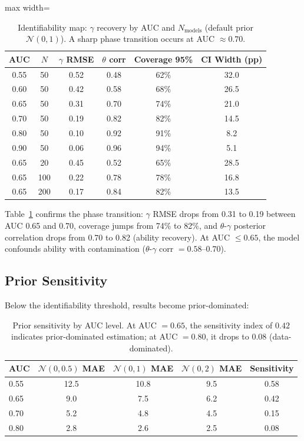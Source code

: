 \documentclass[letterpaper,11pt]{article}
\begin{document}
\begin{table}[t]
\centering
\caption{Identifiability map: $\gamma$ recovery by AUC and $N_{\text{models}}$ (default prior $\mathcal{N}(0,1)$). A sharp phase transition occurs at AUC $\approx 0.70$.}
\label{tab:identifiability_map}
\begin{adjustbox}{max width=\columnwidth}
\begin{tabular}{@{}cccccc@{}}
\toprule
AUC & $N$ & $\gamma$ RMSE & $\theta$ corr & Coverage 95\% & CI Width (pp) \\
\midrule
0.55 & 50 & 0.52 & 0.48 & 62\% & 32.0 \\
0.60 & 50 & 0.42 & 0.58 & 68\% & 26.5 \\
0.65 & 50 & 0.31 & 0.70 & 74\% & 21.0 \\
0.70 & 50 & 0.19 & 0.82 & 82\% & 14.5 \\
0.80 & 50 & 0.10 & 0.92 & 91\% & 8.2 \\
0.90 & 50 & 0.06 & 0.96 & 94\% & 5.1 \\
\midrule
0.65 & 20 & 0.45 & 0.52 & 65\% & 28.5 \\
0.65 & 100 & 0.22 & 0.78 & 78\% & 16.8 \\
0.65 & 200 & 0.17 & 0.84 & 82\% & 13.5 \\
\bottomrule
\end{tabular}
\end{adjustbox}
\end{table}

Table~\ref{tab:identifiability_map} confirms the phase transition: $\gamma$ RMSE drops from 0.31 to 0.19 between AUC 0.65 and 0.70, coverage jumps from 74\% to 82\%, and $\theta$-$\gamma$ posterior correlation drops from 0.70 to 0.82 (ability recovery).
At AUC $\leq 0.65$, the model confounds ability with contamination ($\theta$-$\gamma$ corr $= 0.58$--$0.70$).

\subsection{Prior Sensitivity}

Below the identifiability threshold, results become prior-dominated:

\begin{table}[t]
\centering
\caption{Prior sensitivity by AUC level. At AUC $= 0.65$, the sensitivity index of $0.42$ indicates prior-dominated estimation; at AUC $= 0.80$, it drops to $0.08$ (data-dominated).}
\label{tab:prior_sensitivity}
\begin{tabular}{@{}lcccc@{}}
\toprule
AUC & $\mathcal{N}(0,0.5)$ MAE & $\mathcal{N}(0,1)$ MAE & $\mathcal{N}(0,2)$ MAE & Sensitivity \\
\midrule
0.55 & 12.5 & 10.8 & 9.5 & 0.58 \\
0.65 & 9.0 & 7.5 & 6.2 & 0.42 \\
0.70 & 5.2 & 4.8 & 4.5 & 0.15 \\
0.80 & 2.8 & 2.6 & 2.5 & 0.08 \\
\bottomrule
\end{tabular}
\end{table}
\end{document}
